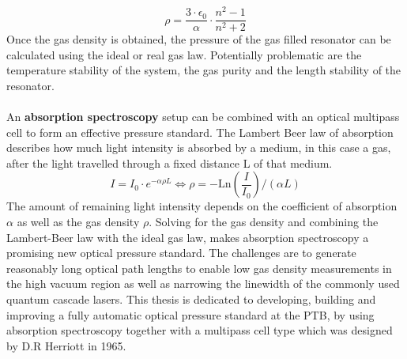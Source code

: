 \begin{equation}
\rho= \frac{3\cdot\epsilon_0}{\alpha}\cdot \frac{n^2-1}{n^2+2}
\label{Lorentz-Lorenzn}
\end{equation}
Once the gas density is obtained, the pressure of the gas filled resonator can be calculated using the ideal or real gas law. Potentially problematic are the temperature stability of the system, the gas purity and the length stability of the resonator.\\\\
\noindent
An \textbf{absorption spectroscopy} setup can be combined with an optical multipass cell to form an effective pressure standard. The Lambert Beer law of absorption describes how much light intensity is absorbed by a medium, in this case a gas, after the light travelled through a fixed distance L of that medium. 
 \begin{equation}
 I = I_0 \cdot e^{ -\alpha \rho L } \Leftrightarrow \rho = - \text{Ln}(\frac{I}{I_0})/(\alpha L)
 \label{introduction-lambert-beer}
 \end{equation}
The amount of remaining light intensity depends on the coefficient of absorption $\alpha$ as well as the gas density $\rho$.  Solving for the gas density and combining the Lambert-Beer law with the ideal gas law, makes absorption spectroscopy a promising  new optical pressure standard. The challenges are  to generate reasonably long optical path lengths to enable low gas density measurements in the high vacuum region as well as narrowing the linewidth of the commonly used quantum cascade lasers. This thesis is dedicated to developing, building and improving a fully automatic optical pressure standard at the PTB, by using absorption spectroscopy together with a multipass cell type which was designed by D.R Herriott in 1965.
\newpage